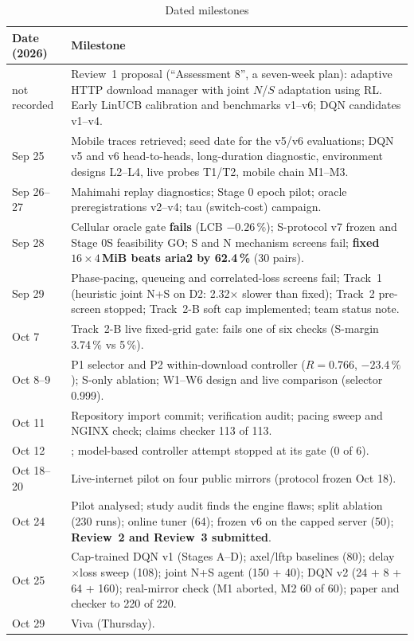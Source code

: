 \begin{table}[H]\centering\small
\caption{Dated milestones}\label{tab:milestones}
\begin{tabularx}{\linewidth}{@{}P{2.6cm}L@{}}
\toprule
\textbf{Date (2026)} & \textbf{Milestone}\\
\midrule
not recorded & Review~1 proposal (``Assessment 8'', a seven-week plan): adaptive HTTP download manager with joint $N$/$S$ adaptation using RL. Early LinUCB calibration and benchmarks v1--v6; DQN candidates v1--v4.\\
Sep 25 & Mobile traces retrieved; seed date for the v5/v6 evaluations; DQN v5 and v6 head-to-heads, long-duration diagnostic, environment designs L2--L4, live probes T1/T2, mobile chain M1--M3.\\
Sep 26--27 & Mahimahi replay diagnostics; Stage 0 epoch pilot; oracle preregistrations v2--v4; tau (switch-cost) campaign.\\
Sep 28 & Cellular oracle gate \textbf{fails} (LCB $-0.26$\,\%); S-protocol v7 frozen and Stage 0S feasibility GO; S and N mechanism screens fail; \textbf{fixed $16\times4$\,MiB beats aria2 by 62.4\,\%} (30 pairs).\\
Sep 29 & Phase-pacing, queueing and correlated-loss screens fail; Track~1 (heuristic joint N+S on D2: 2.32$\times$ slower than fixed); Track~2 pre-screen stopped; Track~2-B soft cap implemented; team status note.\\
Oct 7 & Track~2-B live fixed-grid gate: fails one of six checks (S-margin 3.74\,\% vs 5\,\%).\\
Oct 8--9 & P1 selector and P2 within-download controller ($R=0.766$, $-23.4\,\%$); S-only ablation; W1--W6 design and live comparison (selector 0.999).\\
Oct 11 & Repository import commit; verification audit; pacing sweep and NGINX check; claims checker 113 of 113.\\
Oct 12 & ; model-based controller attempt stopped at its gate (0 of 6).\\
Oct 18--20 & Live-internet pilot on four public mirrors (protocol frozen Oct 18).\\
Oct 24 & Pilot analysed; study audit finds the engine flaws; split ablation (230 runs); online tuner (64); frozen v6 on the capped server (50); \textbf{Review~2 and Review~3 submitted}.\\
Oct 25 & Cap-trained DQN v1 (Stages A--D); axel/lftp baselines (80); delay$\times$loss sweep (108); joint N+S agent (150 + 40); DQN v2 (24 + 8 + 64 + 160); real-mirror check (M1 aborted, M2 60 of 60); paper and checker to 220 of 220.\\
Oct 29 & Viva (Thursday).\\
\bottomrule
\end{tabularx}
\end{table}

